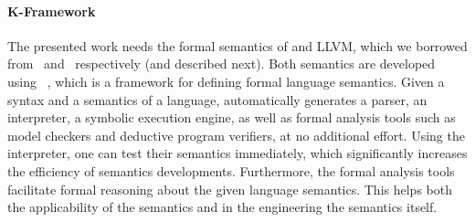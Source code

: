 
\paragraph{K-Framework}\label{par:k} The presented work needs the formal
semantics of \ISA and LLVM, which we borrowed from~\cite{DasguptaAdve:PLDI19}
and~\cite{LLVMSEMA} respectively (and described next). Both semantics are developed using
\K~\cite{k-primer-2013-v32}, which is a
framework for defining formal language semantics. Given a syntax and a
semantics of a language, \K automatically generates a parser, an interpreter, 
a symbolic execution engine, as well as
formal analysis tools such as model checkers and deductive program verifiers,
at no additional effort. Using the interpreter, one can test their
semantics immediately, which significantly increases the efficiency of
semantics developments. Furthermore, the formal analysis tools
facilitate formal reasoning about the given language semantics.  This
helps both the applicability of the semantics and in the
engineering the semantics itself.

